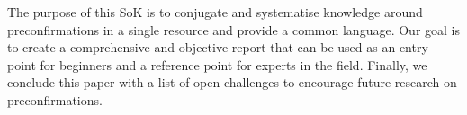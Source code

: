 \documentclass[a4paper]{article}
\theoremstyle{boldstyle}
\newcommand{\cm}[1]{\textcolor{blue}{\textbf{Conor:} #1}}
\newcommand{\lo}[1]{\textcolor{orange}{\textbf{Lin:} #1}}
\newcommand{\dk}[1]{\textcolor{cyan}{\textbf{Demetris:} #1}}
\begin{document}



The purpose of this SoK is to conjugate and systematise knowledge around preconfirmations in a single resource and provide a common language. Our goal is to create a comprehensive and objective report that can be used as an entry point for beginners and a reference point for experts in the field. Finally, we conclude this paper with a list of open challenges to encourage future research on preconfirmations.
\end{document}

